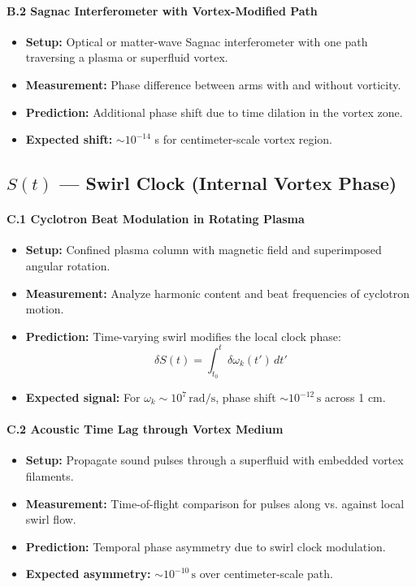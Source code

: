 \documentclass[preprint]{revtex4-2}
\begin{document}
\paragraph{B.2 Sagnac Interferometer with Vortex-Modified Path}
\begin{itemize}
    \item \textbf{Setup:} Optical or matter-wave Sagnac interferometer with one path traversing a plasma or superfluid vortex.
    \item \textbf{Measurement:} Phase difference between arms with and without vorticity.
    \item \textbf{Prediction:} Additional phase shift due to time dilation in the vortex zone.
    \item \textbf{Expected shift:} \(\sim 10^{-14}\) s for centimeter-scale vortex region.
\end{itemize}

\subsection*{\(S(t)\) --- Swirl Clock (Internal Vortex Phase)}

\paragraph{C.1 Cyclotron Beat Modulation in Rotating Plasma}
\begin{itemize}
    \item \textbf{Setup:} Confined plasma column with magnetic field and superimposed angular rotation.
    \item \textbf{Measurement:} Analyze harmonic content and beat frequencies of cyclotron motion.
    \item \textbf{Prediction:} Time-varying swirl modifies the local clock phase:
    \[
        \delta S(t) = \int_{t_0}^{t} \delta \omega_k(t') \, dt'
    \]
    \item \textbf{Expected signal:} For \( \omega_k \sim 10^7 \, \mathrm{rad/s} \), phase shift \( \sim 10^{-12} \, \mathrm{s} \) across 1 cm.
\end{itemize}

\paragraph{C.2 Acoustic Time Lag through Vortex Medium}
\begin{itemize}
    \item \textbf{Setup:} Propagate sound pulses through a superfluid with embedded vortex filaments.
    \item \textbf{Measurement:} Time-of-flight comparison for pulses along vs. against local swirl flow.
    \item \textbf{Prediction:} Temporal phase asymmetry due to swirl clock modulation.
    \item \textbf{Expected asymmetry:} \( \sim 10^{-10} \, \mathrm{s} \) over centimeter-scale path.
\end{itemize}
\end{document}
